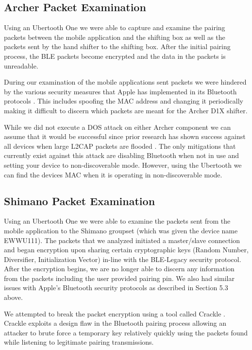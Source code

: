 \documentclass[letterpaper,twocolumn,10pt]{article}
\begin{document}
\subsection{Archer Packet Examination}

Using an Ubertooth One we were able to capture and examine the pairing packets between the mobile application and the shifting box as well as the packets sent by the hand shifter to the shifting box. After the initial pairing process, the BLE packets become encrypted and the data in the packets is unreadable.

During our examination of the mobile applications sent packets we were hindered by the various security measures that Apple has implemented in its Bluetooth protocols \cite{appleblesecurity}. This includes spoofing the MAC address and changing it periodically making it difficult to discern which packets are meant for the Archer D1X shifter.

While we did not execute a DOS attack on either Archer component we can assume that it would be successful since prior research has shown success against all devices when large L2CAP packets are flooded \cite{bluesmack}. The only mitigations that currently exist against this attack are disabling Bluetooth when not in use and setting your device to non-discoverable mode. However, using the Ubertooth we can find the devices MAC when it is operating in non-discoverable mode.

\subsection{Shimano Packet Examination}

Using an Ubertooth One we were able to examine the packets sent from the mobile application to the Shimano groupset (which was given the device name EWWU111). The packets that we analyzed initiated a master/slave connection and began encryption upon sharing certain cryptographic keys (Random Number, Diversifier, Initialization Vector) in-line with the BLE-Legacy security protocol. After the encryption begins, we are no longer able to discern any information from the packets including the user provided pairing pin. We also had similar issues with Apple’s Bluetooth security protocols as described in Section 5.3 above.

We attempted to break the packet encryption using a tool called Crackle \cite{crackle}. Crackle exploits a design flaw in the Bluetooth pairing process allowing an attacker to brute force a temporary key relatively quickly using the packets found while listening to legitimate pairing transmissions.
\end{document}
